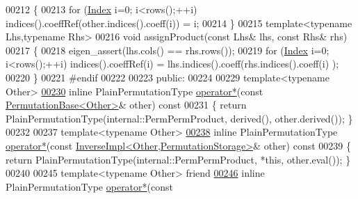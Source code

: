 \begin{DoxyCode}
00212     \{
00213       \textcolor{keywordflow}{for} (\hyperlink{group___core___module_a554f30542cc2316add4b1ea0a492ff02}{Index} i=0; i<rows();++i) indices().coeffRef(other.indices().coeff(i)) = i;
00214     \}
00215     \textcolor{keyword}{template}<\textcolor{keyword}{typename} Lhs,\textcolor{keyword}{typename} Rhs>
00216     \textcolor{keywordtype}{void} assignProduct(\textcolor{keyword}{const} Lhs& lhs, \textcolor{keyword}{const} Rhs& rhs)
00217     \{
00218       eigen\_assert(lhs.cols() == rhs.rows());
00219       \textcolor{keywordflow}{for} (\hyperlink{group___core___module_a554f30542cc2316add4b1ea0a492ff02}{Index} i=0; i<rows();++i) indices().coeffRef(i) = lhs.indices().coeff(rhs.indices().coeff(i)
      );
00220     \}
00221 \textcolor{preprocessor}{#endif}
00222 
00223   \textcolor{keyword}{public}:
00224 
00229     \textcolor{keyword}{template}<\textcolor{keyword}{typename} Other>
\hyperlink{group___core___module_ae81574e059f6b9b7de2ea747fd346a1b}{00230}     \textcolor{keyword}{inline} PlainPermutationType \hyperlink{group___core___module_ae81574e059f6b9b7de2ea747fd346a1b}{operator*}(\textcolor{keyword}{const} \hyperlink{group___core___module_class_eigen_1_1_permutation_base}{PermutationBase<Other>}& 
      other)\textcolor{keyword}{ const}
00231 \textcolor{keyword}{    }\{ \textcolor{keywordflow}{return} PlainPermutationType(internal::PermPermProduct, derived(), other.derived()); \}
00232 
00237     \textcolor{keyword}{template}<\textcolor{keyword}{typename} Other>
\hyperlink{group___core___module_a865e88989a76b7e92f39bad5250b89c4}{00238}     \textcolor{keyword}{inline} PlainPermutationType \hyperlink{group___core___module_a865e88989a76b7e92f39bad5250b89c4}{operator*}(\textcolor{keyword}{const} 
      \hyperlink{class_eigen_1_1_inverse_impl}{InverseImpl<Other,PermutationStorage>}& other)\textcolor{keyword}{ const}
00239 \textcolor{keyword}{    }\{ \textcolor{keywordflow}{return} PlainPermutationType(internal::PermPermProduct, *\textcolor{keyword}{this}, other.eval()); \}
00240 
00245     \textcolor{keyword}{template}<\textcolor{keyword}{typename} Other> \textcolor{keyword}{friend}
\hyperlink{group___core___module_a3f404810659d5095a6db906a4728ddfb}{00246}     \textcolor{keyword}{inline} PlainPermutationType \hyperlink{group___core___module_a3f404810659d5095a6db906a4728ddfb}{operator*}(\textcolor{keyword}{const} 

\end{DoxyCode}
